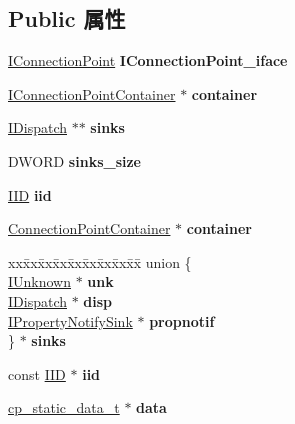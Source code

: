 \subsection*{Public 属性}
\begin{DoxyCompactItemize}
\item 
\mbox{\label{struct_connection_point_a30e71911cae23f62bc40857d38681385}} 
\hyperlink{interface_i_connection_point}{I\+Connection\+Point} {\bfseries I\+Connection\+Point\+\_\+iface}
\item 
\mbox{\label{struct_connection_point_a17764e3c9b100ac8cf1b88da046698be}} 
\hyperlink{interface_i_connection_point_container}{I\+Connection\+Point\+Container} $\ast$ {\bfseries container}
\item 
\mbox{\label{struct_connection_point_a67db2bf650765171be3af867e6bed5a4}} 
\hyperlink{interface_i_dispatch}{I\+Dispatch} $\ast$$\ast$ {\bfseries sinks}
\item 
\mbox{\label{struct_connection_point_a4afc6c4bfa10537bc59de3c9d70a9306}} 
D\+W\+O\+RD {\bfseries sinks\+\_\+size}
\item 
\mbox{\label{struct_connection_point_a9b4095a1a9c4215562b3ef50645a919b}} 
\hyperlink{struct___i_i_d}{I\+ID} {\bfseries iid}
\item 
\mbox{\label{struct_connection_point_ad814a947433e97ff7461cf191d1435d3}} 
\hyperlink{struct_connection_point_container}{Connection\+Point\+Container} $\ast$ {\bfseries container}
\item 
\mbox{\label{struct_connection_point_a77a99d14ab45404f1d2ba0d81fb6b8ee}} 
\begin{tabbing}
xx\=xx\=xx\=xx\=xx\=xx\=xx\=xx\=xx\=\kill
union \{\\
\>\hyperlink{interface_i_unknown}{IUnknown} $\ast$ {\bfseries unk}\\
\>\hyperlink{interface_i_dispatch}{IDispatch} $\ast$ {\bfseries disp}\\
\>\hyperlink{interface_i_property_notify_sink}{IPropertyNotifySink} $\ast$ {\bfseries propnotif}\\
\} $\ast$ {\bfseries sinks}\\

\end{tabbing}\item 
\mbox{\label{struct_connection_point_aabdb005735710dfd33168c6c0f02401b}} 
const \hyperlink{struct___i_i_d}{I\+ID} $\ast$ {\bfseries iid}
\item 
\mbox{\label{struct_connection_point_a26123fb8653078637966eb61d7916d3d}} 
\hyperlink{struct__cp__static__data__t}{cp\+\_\+static\+\_\+data\+\_\+t} $\ast$ {\bfseries data}
\end{DoxyCompactItemize}
